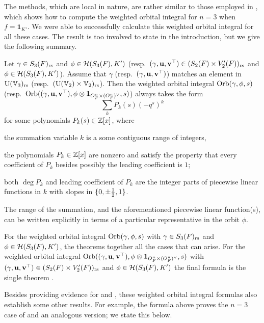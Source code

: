 The methods, which are local in nature,
are rather similar to those employed in \cite{ref:AFL},
which shows how to compute the weighted orbital integral for $n = 3$ when $f = \mathbf{1}_{K'}$.
We were able to successfully calculate this weighted orbital integral for all these cases.
The result is too involved to state in the introduction,
but we give the following summary.
\begin{theorem}
  Let $\gamma \in S_3(F)_{\mathrm{rs}}$ and $\phi \in \mathcal H(S_3(F), K')$
  (resp.\ ${(\gamma, \mathbf u, \mathbf v^\top)} \in (S_2(F) \times V'_2(F))_{\mathrm{rs}}$ and $\phi \in \mathcal H(S_3(F), K')$).
  Assume that $\gamma$ (resp.\ ${(\gamma, \mathbf u, \mathbf v^\top)}$)
  matches an element in $\operatorname{U}(\mathbb V_3)_{\mathrm{rs}}$ (resp.\ $(\operatorname{U}(\mathbb V_2) \times \mathbb V_2)_{\mathrm{rs}}$).
  Then the weighted orbital integral $\operatorname{Orb}(\gamma, \phi, s)$
  (resp.\ $\operatorname{Orb}({(\gamma, \mathbf u, \mathbf v^\top)}, \phi \otimes \mathbf{1}_{O_F^n \times (O_F^n)^\vee}, s)$) always takes the form
  \[ \sum_k P_k(s) (-q^s)^k \]
  for some polynomials $P_k(s) \in \mathbb Z[x]$, where
  \begin{itemize}
    \ii the summation variable $k$ is a some contiguous range of integers,

    \ii the polynomials $P_k \in \mathbb Z[x]$ are nonzero and satisfy the property
    that every coefficient of $P_k$ besides possibly the leading coefficient is $1$;

    \ii both $\deg P_k$ and leading coefficient of $P_k$ are the integer parts
    of piecewise linear functions in $k$ with slopes in $\{0, \pm\frac{1}{2}, 1\}$.
  \end{itemize}
  The range of the summation, and the aforementioned piecewise linear function(s),
  can be written explicitly in terms of a particular representative in the orbit $\phi$.
\end{theorem}
For the weighted orbital integral $\operatorname{Orb}(\gamma, \phi, s)$
with $\gamma \in S_3(F)_{\mathrm{rs}}$ and $\phi \in \mathcal H(S_3(F), K')$,
the theorems  together all the cases that can arise.
For the weighted orbital integral $\operatorname{Orb}({(\gamma, \mathbf u, \mathbf v^\top)}, \phi \otimes \mathbf{1}_{O_F^n \times (O_F^n)^\vee}, s)$
with ${(\gamma, \mathbf u, \mathbf v^\top)} \in (S_2(F) \times V'_2(F))_{\mathrm{rs}}$ and $\phi \in \mathcal H(S_3(F), K')$
the final formula is the single theorem .

Besides providing evidence for  and ,
these weighted orbital integral formulas also establish some other results.
For example, the formula above
proves the $n = 3$ case of \cite[Conjecture 8.2.1]{ref:AFLspherical}
and an analogous version; we state this below.

\begin{theorem}
\end{theorem}

